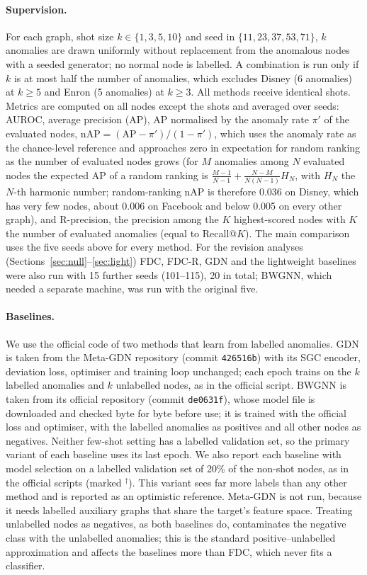 \documentclass[pdflatex,sn-mathphys-ay]{sn-jnl}
\theoremstyle{plain}
\theoremstyle{remark}
\begin{document}
\paragraph{Supervision.} For each graph, shot size $k\in\{1,3,5,10\}$ and seed in $\{11,23,37,53,71\}$, $k$ anomalies are drawn uniformly without replacement from the anomalous nodes with a seeded generator; no normal node is labelled. A combination is run only if $k$ is at most half the number of anomalies, which excludes Disney (6 anomalies) at $k\ge5$ and Enron (5 anomalies) at $k\ge3$. All methods receive identical shots. Metrics are computed on all nodes except the shots and averaged over seeds: AUROC, average precision (AP), AP normalised by the anomaly rate $\pi'$ of the evaluated nodes, $\mathrm{nAP}=(\mathrm{AP}-\pi')/(1-\pi')$, which uses the anomaly rate as the chance-level reference and approaches zero in expectation for random ranking as the number of evaluated nodes grows (for $M$ anomalies among $N$ evaluated nodes the expected AP of a random ranking is $\frac{M-1}{N-1}+\frac{N-M}{N(N-1)}H_N$, with $H_N$ the $N$-th harmonic number; random-ranking nAP is therefore 0.036 on Disney, which has very few nodes, about 0.006 on Facebook and below 0.005 on every other graph), and R-precision, the precision among the $K$ highest-scored nodes with $K$ the number of evaluated anomalies (equal to Recall@$K$). The main comparison uses the five seeds above for every method. For the revision analyses (Sections~\ref{sec:null}--\ref{sec:light}) FDC, FDC-R, GDN and the lightweight baselines were also run with 15 further seeds (101--115), 20 in total; BWGNN, which needed a separate machine, was run with the original five.

\paragraph{Baselines.} We use the official code of two methods that learn from labelled anomalies. GDN \citep{ding2021few} is taken from the Meta-GDN repository (commit \texttt{426516b}) with its SGC encoder, deviation loss, optimiser and training loop unchanged; each epoch trains on the $k$ labelled anomalies and $k$ unlabelled nodes, as in the official script. BWGNN \citep{tang2022rethinking} is taken from its official repository (commit \texttt{de0631f}), whose model file is downloaded and checked byte for byte before use; it is trained with the official loss and optimiser, with the labelled anomalies as positives and all other nodes as negatives. Neither few-shot setting has a labelled validation set, so the primary variant of each baseline uses its last epoch. We also report each baseline with model selection on a labelled validation set of 20\% of the non-shot nodes, as in the official scripts (marked $^{\dagger}$). This variant sees far more labels than any other method and is reported as an optimistic reference. Meta-GDN is not run, because it needs labelled auxiliary graphs that share the target's feature space. Treating unlabelled nodes as negatives, as both baselines do, contaminates the negative class with the unlabelled anomalies; this is the standard positive--unlabelled approximation \citep{elkan2008learning,bekker2020learning} and affects the baselines more than FDC, which never fits a classifier.
\end{document}
